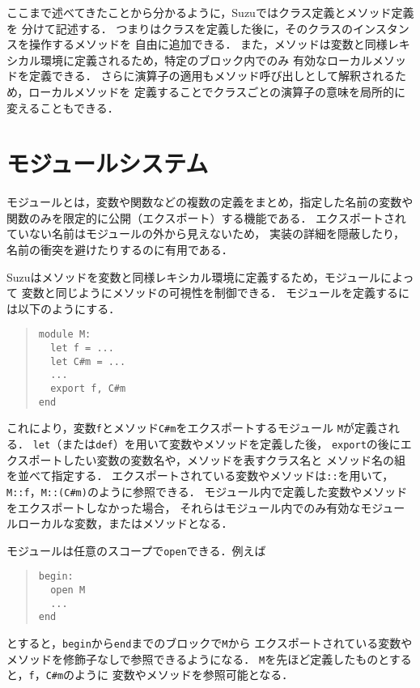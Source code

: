 \documentclass[a4paper,11pt,dvipdfmx]{jreport}
\begin{document}
ここまで述べてきたことから分かるように，Suzuではクラス定義とメソッド定義を
分けて記述する．
つまりはクラスを定義した後に，そのクラスのインスタンスを操作するメソッドを
自由に追加できる．
また，メソッドは変数と同様レキシカル環境に定義されるため，特定のブロック内でのみ
有効なローカルメソッドを定義できる．
さらに演算子の適用もメソッド呼び出しとして解釈されるため，ローカルメソッドを
定義することでクラスごとの演算子の意味を局所的に変えることもできる．

\section{モジュールシステム}

モジュールとは，変数や関数などの複数の定義をまとめ，指定した名前の変数や
関数のみを限定的に公開（エクスポート）する機能である．
エクスポートされていない名前はモジュールの外から見えないため，
実装の詳細を隠蔽したり，名前の衝突を避けたりするのに有用である．

Suzuはメソッドを変数と同様レキシカル環境に定義するため，モジュールによって
変数と同じようにメソッドの可視性を制御できる．
モジュールを定義するには以下のようにする．
\begin{quote}
\begin{verbatim}
module M:
  let f = ...
  let C#m = ...
  ...
  export f, C#m
end
\end{verbatim}
\end{quote}
これにより，変数\verb|f|とメソッド\verb|C#m|をエクスポートするモジュール
\verb|M|が定義される．
\verb|let|（または\verb|def|）を用いて変数やメソッドを定義した後，
\verb|export|の後にエクスポートしたい変数の変数名や，メソッドを表すクラス名と
メソッド名の組を並べて指定する．
エクスポートされている変数やメソッドは\verb|::|を用いて，
\verb|M::f|，\verb|M::(C#m)|のように参照できる．
モジュール内で定義した変数やメソッドをエクスポートしなかった場合，
それらはモジュール内でのみ有効なモジュールローカルな変数，またはメソッドとなる．

モジュールは任意のスコープで\verb|open|できる．例えば
\begin{quote}
\begin{verbatim}
begin:
  open M
  ...
end
\end{verbatim}
\end{quote}
とすると，\verb|begin|から\verb|end|までのブロックで\verb|M|から
エクスポートされている変数やメソッドを修飾子なしで参照できるようになる．
\verb|M|を先ほど定義したものとすると，\verb|f|，\verb|C#m|のように
変数やメソッドを参照可能となる．
\end{document}
